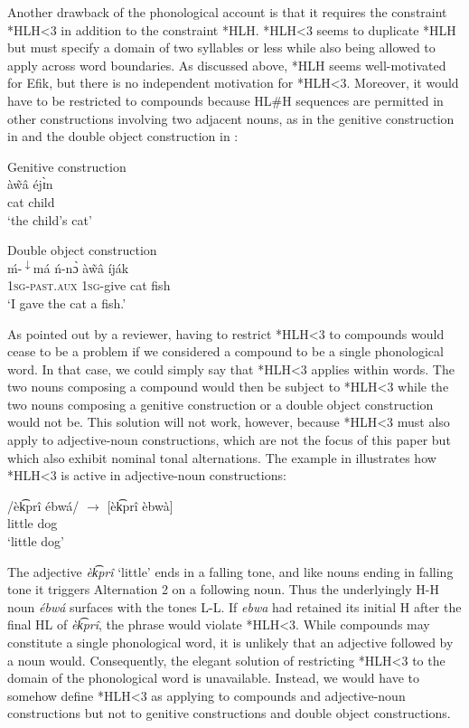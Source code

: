\documentclass[output=paper]{langscibook}
\begin{document}
Another drawback of the phonological account is that it requires the constraint *HLH<3 in addition to the constraint *HLH. *HLH<3 seems to duplicate *HLH but must specify a domain of two syllables or less while also being allowed to apply across word boundaries. As discussed above, *HLH seems well-motivated for Efik, but there is no independent motivation for *HLH<3. Moreover, it would have to be restricted to compounds because HL\#H sequences are permitted in other constructions involving two adjacent nouns, as in the genitive construction in  and the double object construction in : 


\ea \label{ex:glewwe:6}
Genitive construction\\
\gll \textup{à\~{w}â} éjɪ̀n\\
     cat child\\
\glt ‘the child’s cat’  
\z

\ea\label{ex:glewwe:7} 
Double object construction\\
\gll \textup{ḿ-}\textup{\textsuperscript{$\downarrow$}}\textup{má}     \textup{ń-nɔ̀} à\~{w}â   íják \\
     \textsc{1sg-past.aux}  \textsc{1sg-}\textup{give}   \textup{cat}  {fish}\\
\glt ‘I gave the cat a fish.’ 
\z

As pointed out by a reviewer, having to restrict *HLH<3 to compounds would cease to be a problem if we considered a compound to be a single phonological word. In that case, we could simply say that *HLH<3 applies within words. The two nouns composing a compound would then be subject to *HLH<3 while the two nouns composing a genitive construction or a double object construction would not be. This solution will not work, however, because *HLH<3 must also apply to adjective-noun constructions, which are not the focus of this paper but which also exhibit nominal tonal alternations.  The example in  illustrates how *HLH<3 is active in adjective-noun constructions:

\ea\label{ex:glewwe:8} 
\gll /èk͡prî  ébwá/  ${\rightarrow}$  [èk͡prî èbwà]\\ 
     little dog\\
\glt ‘little dog’
\z

The adjective \textit{èk͡prî} ‘little’ ends in a falling tone, and like nouns ending in falling tone it triggers Alternation 2 on a following noun. Thus the underlyingly H-H noun \textit{ébwá} surfaces with the tones L-L. If \textit{ebwa} had retained its initial H after the final HL of \textit{èk͡prî}, the phrase would violate *HLH<3. While compounds may constitute a single phonological word, it is unlikely that an adjective followed by a noun would. Consequently, the elegant solution of restricting *HLH<3 to the domain of the phonological word is unavailable. Instead, we would have to somehow define *HLH<3 as applying to compounds and adjective-noun constructions but not to genitive constructions and double object constructions.   
\end{document}
